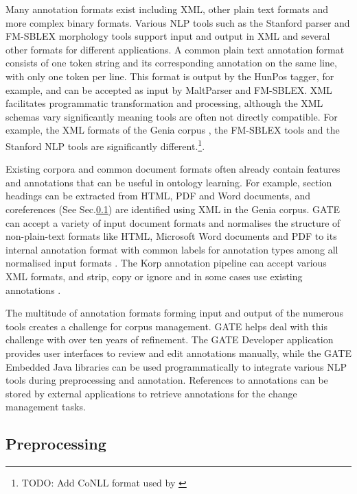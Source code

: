 \documentclass[a4paper]{report}
\newcommand{\todo}[1]{\footnote{{\color{red} TODO: #1}}}
\begin{document}
Many annotation formats exist including XML, other plain text formats and more complex binary formats.
Various NLP tools such as the Stanford parser \citep{Marneffe06StanfPars} and FM-SBLEX morphology tools support input and output in XML and several other formats for different applications. 
A common plain text annotation format consists of one token string and its corresponding annotation on the same line, with only one token per line.
This format is output by the HunPos tagger, for example, and can be accepted as input by MaltParser\citep{Nivre06maltparser} and FM-SBLEX. 
XML facilitates programmatic transformation and processing, although the XML schemas vary significantly meaning tools are often not directly compatible.
For example, the XML formats of the Genia corpus \citep{KimEtAl03GeniaCorpus}, the FM-SBLEX tools and the Stanford NLP tools are significantly different.\todo{Add CoNLL format\citep{NivreEtAl07NoNLL} used by \citep{Nivre06maltparser}}.

Existing corpora and common document formats often already contain features and annotations that can be useful in ontology learning.
For example, section headings can be extracted from HTML, PDF and Word documents, and coreferences (See Sec.\ref{sec:lit-rev:preproc}) are identified using XML in the Genia corpus.
GATE can accept a variety of input document formats and normalises the structure of non-plain-text formats like HTML, Microsoft Word documents and PDF to its internal annotation format with common labels for annotation types among all normalised input formats \citep{Cunningham2011GATEBook}.
The Korp annotation pipeline can accept various XML formats, and strip, copy or ignore and in some cases use existing annotations \cite{Borin12Korp}.

The multitude of annotation formats forming input and output of the numerous tools creates a challenge for corpus management.
GATE helps deal with this challenge with over ten years of refinement. 
The GATE Developer application provides user interfaces to review and edit annotations manually, while the GATE Embedded Java libraries can be used programmatically to integrate various NLP tools during preprocessing and annotation.
References to annotations can be stored by external applications to retrieve annotations for the change management tasks.

\subsection{Preprocessing}
\label{sec:lit-rev:preproc}
\end{document}
